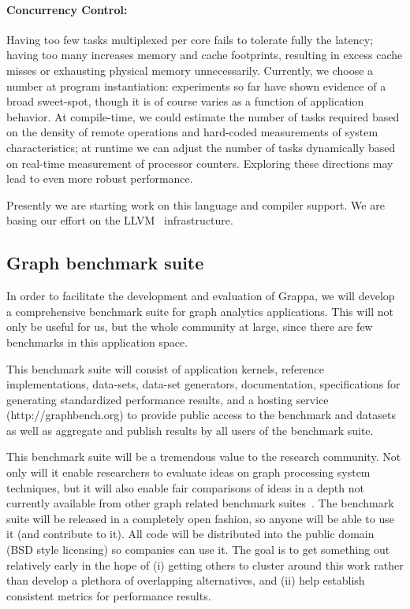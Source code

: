 \paragraph{Concurrency Control: } Having too few tasks multiplexed per core fails to tolerate fully the latency; having too many increases memory and cache footprints, resulting in excess cache misses or exhausting physical memory unnecessarily.  Currently, we choose a number at program instantiation:  experiments so far have shown evidence of a broad sweet-spot, though it is of course varies as a function of application behavior.  At compile-time, we could estimate the number of tasks required based on the density of remote operations and hard-coded measurements of system characteristics; at runtime we can adjust the number of tasks dynamically based on real-time measurement of processor counters.  Exploring these directions may lead to even more robust performance.

Presently we are starting work on this language and compiler support.  We are basing our effort on the LLVM~\cite{llvm} infrastructure.


\subsection{Graph benchmark suite}

In order to facilitate the development and evaluation of Grappa, we will develop a comprehensive benchmark suite for graph analytics applications. This will not only be useful for us, but the whole community at large, since there are few benchmarks in this application space.

This benchmark suite will consist of application kernels, reference implementations, data-sets, data-set generators, documentation, specifications for generating standardized performance results, and a hosting service (http://graphbench.org) to provide public access to the benchmark and datasets as well as aggregate and publish results by all users of the benchmark suite.

This benchmark suite will be a tremendous value to the research community. Not only will it enable researchers to evaluate ideas on graph processing system techniques, but it will also enable fair comparisons of ideas in a depth not currently available from other graph related benchmark suites~\cite{graph500}. The benchmark suite will be released in a completely open fashion, so anyone will be able to use it (and contribute to it).  All code will be distributed into the public domain (BSD style licensing) so companies can use it. The goal is to get something out relatively early in the hope of (i) getting others to cluster around this work rather than develop a plethora of overlapping alternatives, and (ii) help establish consistent metrics for performance results.

